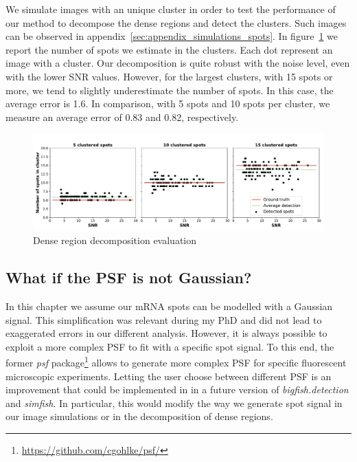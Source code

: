 We simulate images with an unique cluster in order to test the performance of our method to decompose the dense regions and detect the clusters.
Such images can be observed in appendix~\ref{sec:appendix_simulations_spots}.
In figure~\ref{fig:cluster_results} we report the number of spots we estimate in the clusters.
Each dot represent an image with a cluster.
Our decomposition is quite robust with the noise level, even with the lower \ac{SNR} values.
However, for the largest clusters, with 15 spots or more, we tend to slightly underestimate the number of spots.
In this case, the average error is 1.6.
In comparison, with 5 spots and 10 spots per cluster, we measure an average error of 0.83 and 0.82, respectively.

\begin{figure}[h]
    \centering
    \includegraphics[width=1\textwidth]{figures/chapter2/cluster_along_noise}
    \caption{Dense region decomposition evaluation}
    \label{fig:cluster_results}
\end{figure}

\subsection{What if the \ac{PSF} is not Gaussian?} \label{subsec:psf}

In this chapter we assume our \ac{mRNA} spots can be modelled with a Gaussian signal.
This simplification was relevant during my PhD and did not lead to exaggerated errors in our different analysis.
However, it is always possible to exploit a more complex \ac{PSF} to fit with a specific spot signal.
To this end, the former \emph{psf} package\footnote{\url{https://github.com/cgohlke/psf/}} allows to generate more complex \ac{PSF} for specific fluorescent microscopic experiments.
Letting the user choose between different \ac{PSF} is an improvement that could be implemented in in a future version of \emph{bigfish.detection} and \emph{simfish}.
In particular, this would modify the way we generate spot signal in our image simulations or in the decomposition of dense regions.


